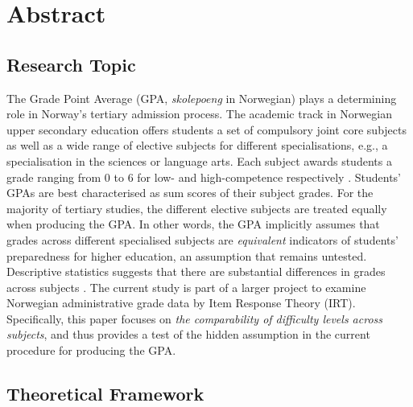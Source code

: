\section{Abstract}


\subsection{Research Topic}

The Grade Point Average (GPA, \textit{skolepoeng} in Norwegian) plays a determining role in Norway's tertiary admission process. The academic track in Norwegian upper secondary education offers students a set of compulsory joint core subjects as well as a wide range of elective subjects for different specialisations, e.g., a specialisation in the sciences or language arts. Each subject awards students a grade ranging from $0$ to $6$ for low- and high-competence respectively \parencite[][\S 3-5]{lovdata:2006}. Students' GPAs are best characterised as sum scores of their subject grades. For the majority of tertiary studies, the different elective subjects are treated equally when producing the GPA. In other words, the GPA implicitly assumes that grades across different specialised subjects are \emph{equivalent} indicators of students' preparedness for higher education, an assumption that remains untested. Descriptive statistics suggests that there are substantial differences in grades across subjects \parencite{udir:2022}. The current study is part of a larger project to examine Norwegian administrative grade data by Item Response Theory (IRT). Specifically, this paper focuses on \textit{the comparability of difficulty levels across subjects}, and thus provides a test of the hidden assumption in the current procedure for producing the GPA.

\subsection{Theoretical Framework}

